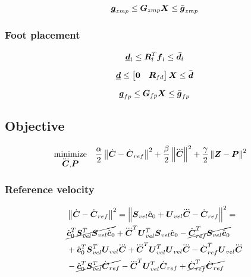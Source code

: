 \begin{equation*}
    \underbar{\mbox{\boldmath $g$}}_{zmp}  \le  \mbox{\boldmath $G$}_{zmp} \mbox{\boldmath $X$}  \le  \bar{\mbox{\boldmath $g$}}_{zmp}
\end{equation*}

\subsubsection{Foot placement}
\begin{equation*}
\underbar{\mbox{\boldmath $d$}}_l \le \mbox{\boldmath $R$}_l^T \mbox{\boldmath $f$}_l \le \bar{\mbox{\boldmath $d$}_l}
\end{equation*}

\begin{equation*}
\underbar{\mbox{\boldmath $d$}} \le \begin{bmatrix} \mbox{\boldmath $0$} & \mbox{\boldmath $R$}_{fd} \end{bmatrix} \mbox{\boldmath $X$} \le \bar{\mbox{\boldmath $d$}}
\end{equation*}

\begin{equation*}
\underbar{\mbox{\boldmath $g$}}_{fp}  \le  \mbox{\boldmath $G$}_{fp} \mbox{\boldmath $X$}  \le  \bar{\mbox{\boldmath $g$}}_{fp}
\end{equation*}



\subsection{Objective}
\begin{equation*}
\begin{split}
    \minimize{\cJerk, \FP}  & \frac{\alpha}{2} \norm{\cVel - \cVel_{ref}}^2 + 
                              \frac{\beta}{2}  \norm{\cJerk}^2 + 
                              \frac{\gamma}{2} \norm{\ZMP - \FP}^2
\end{split}
\end{equation*}

\subsubsection{Reference velocity}
\begin{equation*}
\begin{split}
    &\norm{\cVel - \cVel_{ref}}^2 
    = 
    \norm{\M{S}_{vel} \cstate_0  +  \M{U}_{vel} \cJerk  -  \cVel_{ref}}^ 2 
    = \\
    & \cancel{\cstate_0^T \M{S}_{vel}^T  \M{S}_{vel} \cstate_0}  
    +  
    \cJerk^T \M{U}_{vel}^T \M{S}_{vel} \cstate_0  
    -  
    \cancel{\cVel_{ref}^T \M{S}_{vel} \cstate_0}\\
%
    & +  
    \cstate_0^T \M{S}_{vel}^T \M{U}_{vel} \cJerk  
    +  
    \cJerk^T \M{U}_{vel}^T \M{U}_{vel} \cJerk   
    -  
    \cVel_{ref}^T \M{U}_{vel} \cJerk\\
%
    & -  
    \cancel{\cstate_0^T \M{S}_{vel}^T \cVel_{ref}}  
    -  
    \cJerk^T \M{U}_{vel}^T \cVel_{ref}  
    +  
    \cancel{\cVel_{ref}^T \cVel_{ref}}
\end{split}
\end{equation*}

